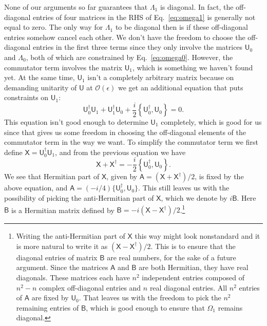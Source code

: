 None of our arguments so far guarantees that $\Lambda_{1}$ is diagonal.
In fact, the off-diagonal entries of four matrices in the RHS of Eq.~\eqref{eq:omega1} is generally not equal to zero.
The only way for $\Lambda_{1}$ to be diagonal then is if these off-diagonal entries somehow cancel each other.
We don't have the freedom to choose the off-diagonal entries in the first three terms since they only involve the matrices $\mathsf{U}_{0}$ and $\Lambda_{0}$, both of which are constrained by Eq.~\eqref{eq:omega0}.
However, the commutator term involves the matrix $\mathsf{U}_{1}$, which is something we haven't found yet.
At the same time, $\mathsf{U}_{1}$ isn't a completely arbitrary matrix because on demanding unitarity of $\mathsf{U}$ at $\mathcal{O}(\epsilon)$ we get an additional equation that puts constraints on $\mathsf{U}_{1}$:
%
\begin{equation}
  \mathsf{U}_{0}^{\dagger}\mathsf{U}_{1} + \mathsf{U}_{1}^{\dagger}\mathsf{U}_{0} + \frac{i}{2}\left\{\mathsf{U}_{0}^{\dagger}, \mathsf{U}_{0}\right\}= 0.
  \label{eq:unitarity}
\end{equation}
%
This equation isn't good enough to determine $\mathsf{U}_{1}$ completely, which is good for us since that gives us some freedom in choosing the off-diagonal elements of the commutator term in the way we want.
To simplify the commutator term we first define $\mathsf{X} = \mathsf{U}_{0}^{\dagger}\mathsf{U}_{1}$, and from the previous equation we have
%
\begin{equation}
  \mathsf{X} + \mathsf{X}^{\dagger} = -\frac{i}{2}\left\{\mathsf{U}_{0}^{\dagger}, \mathsf{U}_{0}\right\}.
\end{equation}
%
We see that Hermitian part of $\mathsf{X}$, given by $\mathsf{A} = (\mathsf{X} + \mathsf{X}^{\dagger})/2$, is fixed by the above equation, and $\mathsf{A} = (-i/4)\{\mathsf{U}_{0}^{\dagger},\mathsf{U}_{0}\}$.
This still leaves us with the possibility of picking the anti-Hermitian part of $\mathsf{X}$, which we denote by $i\mathsf{B}$. Here $\mathsf{B}$ is a Hermitian matrix defined by $\mathsf{B} = -i(\mathsf{X} - \mathsf{X}^{\dagger})/2$.\footnote{%
  Writing the anti-Hermitian part of $\mathsf{X}$ this way might look nonstandard and it is more natural to write it as $(\mathsf{X} - \mathsf{X}^{\dagger})/2$.
  This is to ensure that the diagonal entries of matrix $\mathsf{B}$ are real numbers, for the sake of a future argument.
Since the matrices $\mathsf{A}$ and $\mathsf{B}$ are both Hermitian, they have real diagonals.
  These matrices each have $n^{2}$ independent entries composed of $n^{2} - n$ complex off-diagonal entries and $n$ real diagonal entries.
  All $n^{2}$ entries of $\mathsf{A}$ are fixed by $\mathsf{U}_{0}$.
  That leaves us with the freedom to pick the $n^{2}$ remaining entries of $\mathsf{B}$, which is good enough to ensure that $\Omega_{1}$ remains diagonal.
}
